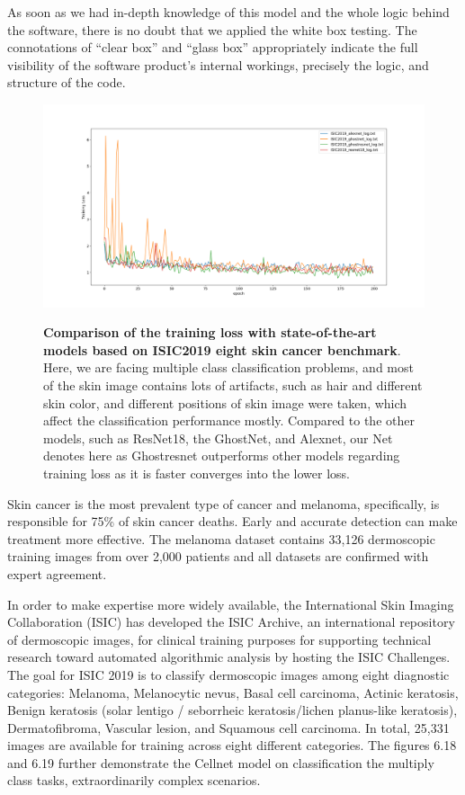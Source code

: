 As soon as we had in-depth knowledge of this model and the whole logic behind the software, there is no doubt that we applied the white box testing.
The connotations of “clear box” and “glass box” appropriately indicate the full visibility of the software product's internal workings, precisely the logic, and structure of the code. 






\begin{figure}[t]
\includegraphics[height=0.4\textheight,width=1\textwidth]{thesis-template-master/images/loss_train.png}
\label{fig:cellnet}
\caption{ \textbf{Comparison of the training loss with state-of-the-art models based on ISIC2019 eight skin cancer benchmark}. Here, we are facing multiple class classification problems, and most of the skin image contains lots of artifacts, such as hair and different skin color, and different positions of skin image were taken, which affect the classification performance mostly. Compared to the other models, such as ResNet18, the GhostNet, and Alexnet, our Net denotes here as Ghostresnet outperforms other models regarding training loss as it is faster converges into the lower loss. }
\end{figure}

Skin cancer is the most prevalent type of cancer and melanoma, specifically, is responsible for 75\% of skin cancer deaths. Early and accurate detection can make treatment more effective. The melanoma dataset contains 33,126 dermoscopic training images from over 2,000 patients and all datasets are confirmed with expert agreement.

In order to make expertise more widely available, the International Skin Imaging Collaboration (ISIC) has developed the ISIC Archive, an international repository of dermoscopic images, for clinical training purposes for supporting technical research toward automated algorithmic analysis by hosting the ISIC Challenges.
The goal for ISIC 2019 is to classify dermoscopic images among eight diagnostic categories: Melanoma, Melanocytic nevus, Basal cell carcinoma, Actinic keratosis, Benign keratosis (solar lentigo / seborrheic keratosis/lichen planus-like keratosis), Dermatofibroma, Vascular lesion, and Squamous cell carcinoma. In total, 25,331 images are available for training across eight different categories. The figures 6.18 and 6.19 further demonstrate the Cellnet model on classification the multiply class tasks, extraordinarily complex scenarios.

